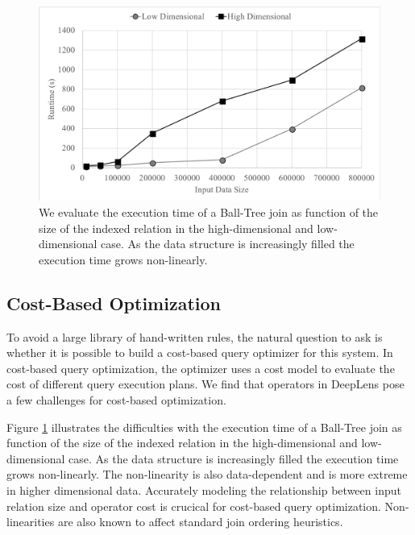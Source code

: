 \begin{figure}[t]
\centering
 \includegraphics[width=\columnwidth]{figures/spatialjoin.png}
 \caption{We evaluate the execution time of a Ball-Tree join as function of the size of the indexed relation in the high-dimensional and low-dimensional case. As the data structure is increasingly filled the execution time grows non-linearly.   \label{join} }
\end{figure}

\subsection{Cost-Based Optimization}
To avoid a large library of hand-written rules, the natural question to ask is whether it is possible to build a cost-based query optimizer for this system.
In cost-based query optimization, the optimizer uses a cost model to evaluate the cost of different query execution plans. We find that operators in \textsf{DeepLens} pose a few challenges for cost-based optimization. 

Figure \ref{join} illustrates the difficulties with the execution time of a Ball-Tree join as function of the size of the indexed relation in the high-dimensional and low-dimensional case. As the data structure is increasingly filled the execution time grows non-linearly. The non-linearity is also data-dependent and is more extreme in higher dimensional data. Accurately modeling the relationship between input relation size and operator cost is crucical for cost-based query optimization. Non-linearities are also known to affect standard join ordering heuristics.


